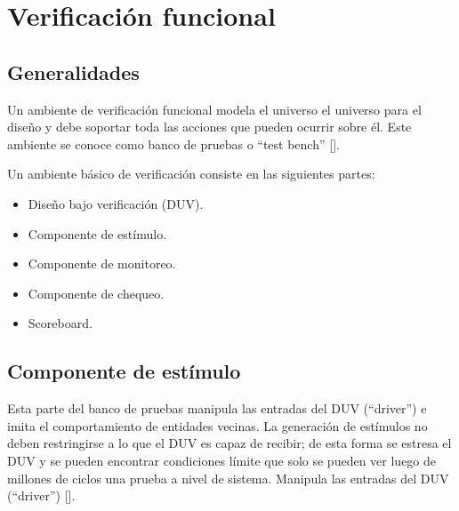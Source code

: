 



\section{Verificación funcional}

\subsection{Generalidades}

Un ambiente de verificación funcional modela el universo el universo para el diseño y debe soportar toda las acciones que pueden ocurrir sobre él. Este ambiente se conoce como banco de pruebas o “test bench” [\cite{Wile}].

Un ambiente básico de verificación consiste en las siguientes partes:

\begin{itemize}
\item Diseño bajo verificación (DUV).
\item Componente de estímulo.
\item Componente de monitoreo.
\item Componente de chequeo.
\item Scoreboard.
\end{itemize}

\subsection{Componente de estímulo}

Esta parte del banco de pruebas manipula las entradas del DUV (“driver”) e imita el comportamiento de entidades vecinas.
La generación de estímulos no deben restringirse
a lo que el DUV es capaz de recibir; de esta forma se estresa el DUV y se pueden encontrar condiciones límite que solo se pueden ver luego de millones de ciclos una prueba a nivel de sistema. Manipula las entradas del DUV (“driver”) [\cite{Wile}].

